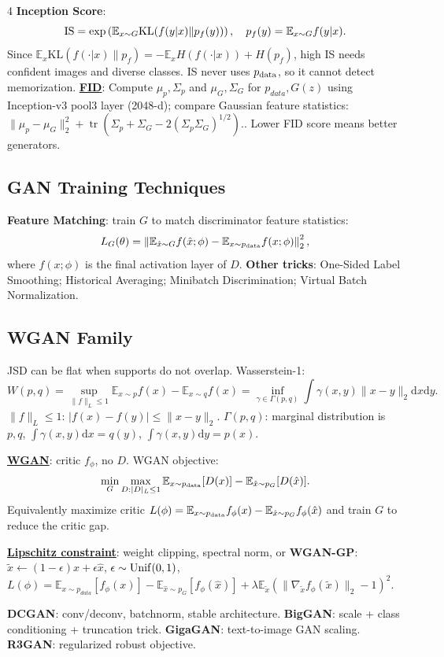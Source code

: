\documentclass{article}
\newcommand{\key}[1]{\textbf{#1}}
\newcommand{\lowterm}[1]{\textbf{\underline{#1}}}
\newcommand{\E}{\mathbb{E}}
\newcommand{\KL}{\mathrm{KL}}
\newcommand{\1}{\mathbf 1}
\newcommand{\dd}{\mathrm{d}}
\DeclareMathOperator{\tr}{tr}
\begin{document}
\begin{multicols*}{4}
\key{Inception Score}:
\[
{\rm IS}=\exp\left(\E_{x\sim G}\KL(f(y|x)\|p_f(y))\right),\quad p_f(y)=\E_{x\sim G}f(y|x).
\]
Since $\E_x\KL(f(\cdot|x)\|p_f)=-\E_xH(f(\cdot|x))+H(p_f)$, high IS needs confident images and diverse classes. IS never uses $p_{\rm data}$, so it cannot detect memorization. \lowterm{FID}: Compute $\mu_p,\Sigma_p$ and $\mu_G,\Sigma_G$ for $p_{data},G(z)$ using Inception-v3 pool3 layer (2048-d); compare Gaussian feature statistics:
\(
\|\mu_p-\mu_G\|_2^2+\tr(\Sigma_p+\Sigma_G-2(\Sigma_p\Sigma_G)^{1/2}).
\). Lower FID score means better generators.

\subsection{GAN Training Techniques}
\key{Feature Matching}: train $G$ to match discriminator feature statistics:
\[
L_G(\theta)=\left\|\E_{\hat x\sim G}f(\hat x;\phi)-\E_{x\sim p_{\rm data}}f(x;\phi)\right\|_2^2,
\]
where $f(x;\phi)$ is the final activation layer of $D$. \key{Other tricks}: One-Sided Label Smoothing; Historical Averaging; Minibatch Discrimination; Virtual Batch Normalization.

\subsection{WGAN Family}
JSD can be flat when supports do not overlap. Wasserstein-1:
\[
W(p,q)=\sup_{\|f\|_L\le1}\E_{x\sim p}f(x)-\E_{x\sim q}f(x)
=\inf_{\gamma\in\Gamma(p,q)} \int \gamma(x,y)\|x-y\|_2\dd x\dd y.
\]
$\|f\|_L\le1$: $|f(x)-f(y)|\leq \|x-y\|_2$.  $\Gamma(p,q)$: marginal distribution is $p,q$, $\int\gamma(x,y)\dd x=q(y)$, $\int \gamma(x,y)\dd y=p(x)$. 

\lowterm{WGAN}: critic $f_\phi$, no $D$. 
WGAN objective:
\[
\min_G\max_{D:|D|_L\le1}\E_{x\sim p_{\rm data}}[D(x)]-\E_{\hat x\sim p_G}[D(\hat x)].
\]
Equivalently maximize critic $L(\phi)=\E_{x\sim p_{\rm data}}f_\phi(x)-\E_{\hat x\sim p_G}f_\phi(\hat x)$ and train $G$ to reduce the critic gap.


\lowterm{Lipschitz constraint}: weight clipping, spectral norm, or \key{WGAN-GP}: 
$\tilde{x}\gets (1-\epsilon)x+\epsilon\hat{x}$, $\epsilon\sim {\rm Unif}(0,1)$, 
\(
L(\phi)=\E_{x\sim p_{data}}[f_\phi(x)]-\E_{\hat{x}\sim p_G}[f_\phi(\hat x)]+\lambda\E_{\tilde{x}}(\|\nabla_{\tilde x}f_\phi(\tilde x)\|_2-1)^2.
\) 

\key{DCGAN}: conv/deconv, batchnorm, stable architecture. \key{BigGAN}: scale + class conditioning + truncation trick. \key{GigaGAN}: text-to-image GAN scaling. \key{R3GAN}: regularized robust objective.


\end{multicols*}
\end{document}
